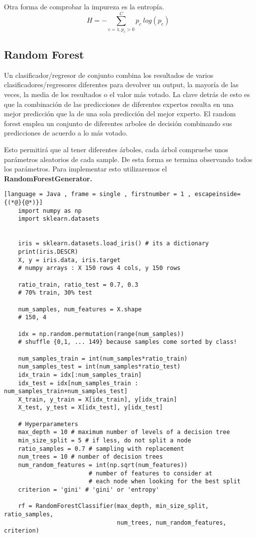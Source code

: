 \documentclass[11pt]{article}
\theoremstyle{plain}
\begin{document}
                Otra forma de comprobar la impureza es la entropía.
                \begin{equation}
                     H = - \sum_{c = 1, p_c > 0}^{C} p_c \ log(p_c)
                 \end{equation} 
        \subsection{Random Forest} %
        \label{sub:random_forest}
            Un clasificador/regresor de conjunto combina los resultados de varios clasificadores/regresores diferentes para devolver un output, la mayoría de las veces, la media de los resultados o el valor más votado. La clave detrás de esto es que la combinación de las predicciones de diferentes expertos resulta en una mejor predicción que la de una sola predicción del mejor experto. El random forest emplea un conjunto de diferentes arboles de decisión combinando sus predicciones de acuerdo a lo más votado.

            Esto permitirá que al tener diferentes árboles, cada árbol compruebe unos parámetros aleatorios de cada sample. De esta forma se termina observando todos los parámetros. Para implementar esto utilizaremos el \textbf{RandomForestGenerator.}
            \begin{lstlisting}[language = Java , frame = single , firstnumber = 1 , escapeinside={(*@}{@*)}]
    import numpy as np
    import sklearn.datasets


    iris = sklearn.datasets.load_iris() # its a dictionary
    print(iris.DESCR)
    X, y = iris.data, iris.target
    # numpy arrays : X 150 rows 4 cols, y 150 rows

    ratio_train, ratio_test = 0.7, 0.3
    # 70% train, 30% test

    num_samples, num_features = X.shape
    # 150, 4

    idx = np.random.permutation(range(num_samples))
    # shuffle {0,1, ... 149} because samples come sorted by class!

    num_samples_train = int(num_samples*ratio_train)
    num_samples_test = int(num_samples*ratio_test)
    idx_train = idx[:num_samples_train]
    idx_test = idx[num_samples_train : num_samples_train+num_samples_test]
    X_train, y_train = X[idx_train], y[idx_train]
    X_test, y_test = X[idx_test], y[idx_test]

    # Hyperparameters
    max_depth = 10 # maximum number of levels of a decision tree
    min_size_split = 5 # if less, do not split a node
    ratio_samples = 0.7 # sampling with replacement
    num_trees = 10 # number of decision trees
    num_random_features = int(np.sqrt(num_features))
                        # number of features to consider at
                        # each node when looking for the best split
    criterion = 'gini' # 'gini' or 'entropy'

    rf = RandomForestClassifier(max_depth, min_size_split, ratio_samples,
                                num_trees, num_random_features, criterion)
            \end{lstlisting}
\end{document}
